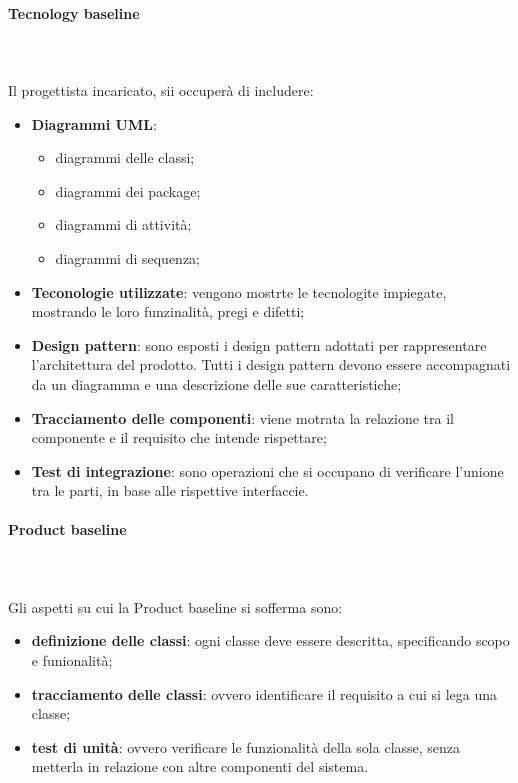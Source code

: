 			\paragraph{Tecnology baseline} \mbox{} \\ \mbox{} \\
			Il progettista incaricato, sii occuperà di includere:
			\begin{itemize}
				\item[] \textbf{Diagrammi UML}:
				\begin{itemize}
					\item[] diagrammi delle classi;
					\item[] diagrammi dei package;
					\item[] diagrammi di attività;
					\item[] diagrammi di sequenza;
				\end{itemize}
				\item[] \textbf{Teconologie utilizzate}: vengono mostrte le tecnologite impiegate, mostrando le loro funzinalità, pregi e difetti;
				\item[] \textbf{Design pattern}\glo : sono esposti i design pattern adottati per rappresentare l'architettura del prodotto. Tutti i design pattern devono essere accompagnati da un diagramma e una descrizione delle sue caratteristiche;
				\item[] \textbf{Tracciamento delle componenti}: viene motrata la relazione tra il componente e il requisito che intende rispettare; 
				\item[] \textbf{Test di integrazione}: sono operazioni che si occupano di verificare l'unione tra le parti, in base alle rispettive interfaccie.
			\end{itemize}
			\paragraph{Product baseline} \mbox{} \\ \mbox{} \\
			Gli aspetti su cui la  Product baseline si sofferma sono:
				\begin{itemize}
					\item[] \textbf{definizione delle classi}: ogni classe deve essere descritta, specificando scopo e funionalità;
					\item[] \textbf{tracciamento delle classi}: ovvero identificare il requisito a cui si lega una classe;
					\item[] \textbf{test di unità}: ovvero verificare le funzionalità della sola classe, senza metterla in relazione con altre componenti del sistema.
				\end{itemize}
